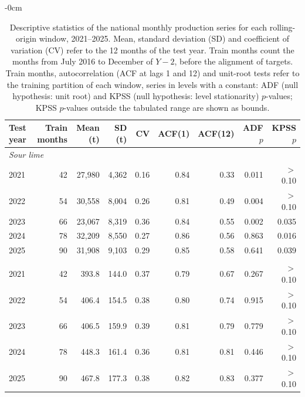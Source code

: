 \begin{table}[htbp]
\centering
\footnotesize
\setlength{\tabcolsep}{4pt}
\caption{Descriptive statistics of the national monthly production series for each rolling-origin window, 2021--2025. Mean, standard deviation (SD) and coefficient of variation (CV) refer to the 12 months of the test year. Train months count the months from July 2016 to December of $Y-2$, before the alignment of targets. Train months, autocorrelation (ACF at lags 1 and 12) and unit-root tests refer to the training partition of each window, series in levels with a constant: ADF \cite{dickey1979distribution} (null hypothesis: unit root) and KPSS \cite{kwiatkowski1992testing} (null hypothesis: level stationarity) $p$-values; KPSS $p$-values outside the tabulated range are shown as bounds.}
\label{tab:main_descriptive_series}
\begin{adjustwidth}{-\extralength}{0cm}
\centering
\begin{tabular}{lrrrrrrrr}
\toprule
Test year & Train months & Mean (t) & SD (t) & CV & ACF(1) & ACF(12) & ADF $p$ & KPSS $p$ \\
\midrule
\multicolumn{9}{l}{\textit{Sour lime}} \\
2021 & 42 & 27,980 & 4,362 & 0.16 & 0.84 & 0.33 & 0.011 & $>$0.10 \\
2022 & 54 & 30,558 & 8,004 & 0.26 & 0.81 & 0.49 & 0.004 & $>$0.10 \\
2023 & 66 & 23,067 & 8,319 & 0.36 & 0.84 & 0.55 & 0.002 & 0.035 \\
2024 & 78 & 32,209 & 8,550 & 0.27 & 0.86 & 0.56 & 0.863 & 0.016 \\
2025 & 90 & 31,908 & 9,103 & 0.29 & 0.85 & 0.58 & 0.641 & 0.039 \\
\addlinespace
\multicolumn{9}{l}{\textit{Sweet lime}} \\
2021 & 42 & 393.8 & 144.0 & 0.37 & 0.79 & 0.67 & 0.267 & $>$0.10 \\
2022 & 54 & 406.4 & 154.5 & 0.38 & 0.80 & 0.74 & 0.915 & $>$0.10 \\
2023 & 66 & 406.5 & 159.9 & 0.39 & 0.81 & 0.79 & 0.779 & $>$0.10 \\
2024 & 78 & 448.3 & 161.4 & 0.36 & 0.81 & 0.81 & 0.446 & $>$0.10 \\
2025 & 90 & 467.8 & 177.3 & 0.38 & 0.82 & 0.83 & 0.377 & $>$0.10 \\
\bottomrule
\end{tabular}
\end{adjustwidth}
\end{table}

